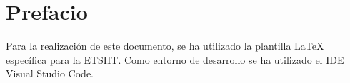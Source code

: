 \chapter*{Prefacio}

Para la realización de este documento, se ha utilizado la plantilla \LaTeX \cite{guervos_jjplantilla-tfg-etsiit_2024} específica para la ETSIIT. Como entorno de desarrollo se ha utilizado el IDE Visual Studio Code.